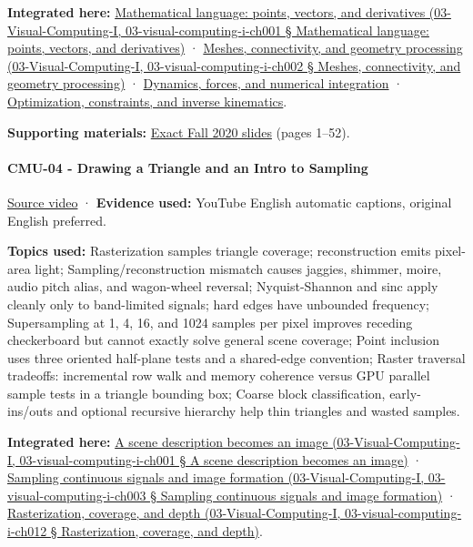 \textbf{Integrated here:} \href{}{Mathematical language: points, vectors, and derivatives (03-Visual-Computing-I, 03-visual-computing-i-ch001 § Mathematical language: points, vectors, and derivatives)} · \href{}{Meshes, connectivity, and geometry processing (03-Visual-Computing-I, 03-visual-computing-i-ch002 § Meshes, connectivity, and geometry processing)} · \hyperref[04-visual-computing-ii-ch029]{Dynamics, forces, and numerical integration} · \hyperref[04-visual-computing-ii-ch029]{Optimization, constraints, and inverse kinematics}.

\textbf{Supporting materials:} \href{https://15462.courses.cs.cmu.edu/fall2020content/lectures/03_vectorcalc/03_vectorcalc_slides.pdf}{Exact Fall 2020 slides} (pages 1--52).

\paragraph{CMU-04 - Drawing a Triangle and an Intro to Sampling}\label{cmu-04---drawing-a-triangle-and-an-intro-to-sampling}

\href{https://www.youtube.com/watch?v=B0hsT2npIc0}{Source video} · \textbf{Evidence used:} YouTube English automatic captions, original English preferred.

\textbf{Topics used:} Rasterization samples triangle coverage; reconstruction emits pixel-area light; Sampling/reconstruction mismatch causes jaggies, shimmer, moire, audio pitch alias, and wagon-wheel reversal; Nyquist-Shannon and sinc apply cleanly only to band-limited signals; hard edges have unbounded frequency; Supersampling at 1, 4, 16, and 1024 samples per pixel improves receding checkerboard but cannot exactly solve general scene coverage; Point inclusion uses three oriented half-plane tests and a shared-edge convention; Raster traversal tradeoffs: incremental row walk and memory coherence versus GPU parallel sample tests in a triangle bounding box; Coarse block classification, early-ins/outs and optional recursive hierarchy help thin triangles and wasted samples.

\textbf{Integrated here:} \href{}{A scene description becomes an image (03-Visual-Computing-I, 03-visual-computing-i-ch001 § A scene description becomes an image)} · \href{}{Sampling continuous signals and image formation (03-Visual-Computing-I, 03-visual-computing-i-ch003 § Sampling continuous signals and image formation)} · \href{}{Rasterization, coverage, and depth (03-Visual-Computing-I, 03-visual-computing-i-ch012 § Rasterization, coverage, and depth)}.

